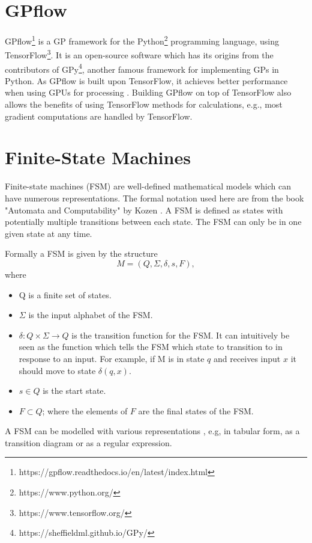 \section{GPflow}
GPflow\footnote{https://gpflow.readthedocs.io/en/latest/index.html} \cite{GPflow2017} is a GP framework for the Python\footnote{https://www.python.org/} programming language, using TensorFlow\footnote{https://www.tensorflow.org/}.
It is an open-source software which has its origins from the contributors of GPy\footnote{https://sheffieldml.github.io/GPy/}, another famous framework for implementing GPs in Python.
As GPflow is built upon TensorFlow, it achieves better performance when using GPUs for processing \cite{GPflow2017}.
Building GPflow on top of TensorFlow also allows the benefits of using TensorFlow methods for calculations, e.g., most gradient computations are handled by TensorFlow.

\section{Finite-State Machines}
Finite-state machines (FSM) are well-defined mathematical models which can have numerous representations.
The formal notation used here are from the book "Automata and Computability" by Kozen \cite{Kozen1997}.
A FSM is defined as states with potentially multiple transitions between each state.
The FSM can only be in one given state at any time.

Formally a FSM is given by the structure
\[M = (Q, \Sigma, \delta, s, F),\]
where
\begin{itemize}
    \item Q is a finite set of states.
    \item $\Sigma$ is the input alphabet of the FSM.
    \item $\delta : Q \times \Sigma \rightarrow Q$ is the transition function for the FSM.
    It can intuitively be seen as the function which tells the FSM which state to transition to in response to an input.
    For example, if M is in state $q$ and receives input $x$ it should move to state $\delta(q, x)$.
    \item $s \in Q$ is the start state.
    \item $F \subset Q$; where the elements of $F$ are the final states of the FSM.
\end{itemize}

A FSM can be modelled with various representations \cite{Kozen1997}, e.g, in tabular form, as a transition diagram or as a regular expression.

